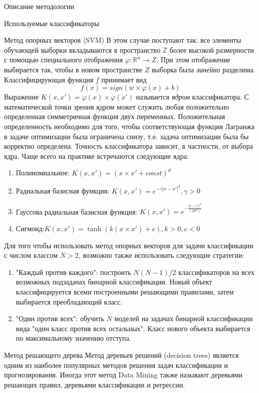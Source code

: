 \begin{section}{Описание методологии}
\begin{subsection}{Используемые классификаторы}
\begin{subsubsection}{Метод опорных векторов (SVM)}
В этом случае поступают так: все элементы обучающей выборки вкладываются в пространство $\mathbb{Z}$ более высокой размерности с помощью специального отображения $\varphi:\mathbb{R}^n \rightarrow Z$. При этом отображение  выбирается так, чтобы в новом пространстве $Z$ выборка была \textit{линейно} разделима.
Классифицирующая функция $f$ принимает вид
\begin{equation}
  f(x)=sign (w \times \varphi(x)+b)
\end{equation}
Выражение $K(x,x')= \varphi(x)\times \varphi(x')$ называется \textit{ядром} классификатора. С математической точки зрения ядром может служить любая положительно определенная симметричная функция двух переменных. Положительная определенность необходимо для того, чтобы соответствующая функция Лагранжа в задаче оптимизации была ограничена снизу, т.е. задача оптимизации была бы корректно определена. Точность классификатора зависит, в частности, от выбора ядра.
Чаще всего на практике встречаются следующие ядра:
\begin{enumerate}
  \item Полиномиальное: $K(x,x')= (x \times x'+ const)^d$
  \item Радиальная базисная функция: $K(x,x')= e^{-\gamma|x-x'|^2},\gamma > 0$
  \item Гауссова радиальная базисная функция: $K(x,x')= e^{-\frac{|x-x'|^2}{(2\sigma^2)}}$
  \item Сигмоид:$K(x,x') = \tanh⁡(k(x\times x')+c), k > 0, c < 0$
\end{enumerate}


Для того чтобы использовать метод опорных векторов для задачи классификации с числом классом $N > 2$, возможно также использовать следующие стратегии:
\begin{enumerate}
  \item "Каждый против каждого": построить $N(N-1)/2$ классификаторов на всех возможных подзадачах бинарной классификации. Новый объект классифицируется всеми построенными решающими правилами, затем выбирается преобладающий класс.
  \item "Один против всех": обучить $N$ моделей на задачах бинарной классификации вида "один класс против всех остальных". Класс нового объекта выбирается по максимальному значению отступа.
\end{enumerate}

    \end{subsubsection}

    \begin{subsubsection}{Метод решающего дерева}
Метод деревьев решений (decision trees) является одним из наиболее популярных методов решения задач классификации и прогнозирования. Иногда этот метод Data Mining также называют деревьями решающих правил, деревьями классификации и регрессии.


\end{subsubsection}
\end{subsection}
\end{section}
